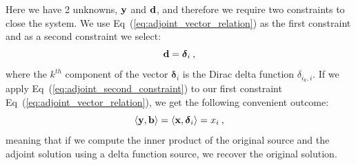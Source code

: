 \documentclass{mc2013}
\begin{document}
Here we have 2 unknowns, $\mathbf{y}$ and $\mathbf{d}$, and therefore we
require two constraints to close the system. We use
Eq~(\ref{eq:adjoint_vector_relation}) as the first constraint and as a
second constraint we select:
\begin{equation}
  \mathbf{d} = \boldsymbol{\delta}_i\:,
  \label{eq:adjoint_second_constraint}
\end{equation}
where the $k^{th}$ component of the vector $\boldsymbol{\delta}_i$ is
the Dirac delta function $\delta_{i_k,i}$. If we apply
Eq~(\ref{eq:adjoint_second_constraint}) to our first constraint
Eq~(\ref{eq:adjoint_vector_relation}), we get the following convenient
outcome:
\begin{equation}
  \langle \mathbf{y}, \mathbf{b} \rangle = \langle \mathbf{x},
  \boldsymbol{\delta}_i \rangle = x_i \:,
  \label{eq:inner_product_constraint}
\end{equation}
meaning that if we compute the inner product of the original source and
the adjoint solution using a delta function source, we recover the
original solution.
\end{document}
